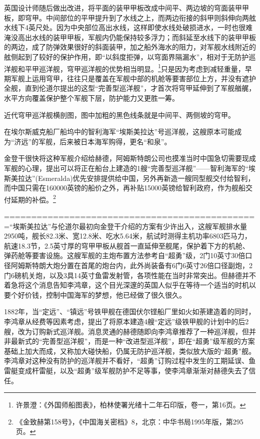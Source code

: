 \documentclass[12pt,UTF8]{ctexbook}
\begin{document}
英国设计师随后做出改进，将平面的装甲甲板改成中间平、两边坡的穹面装甲甲板，即穹甲。中间部位的平甲提升到了水线之上，而两边衔接的斜甲则斜伸向两舷水线下4英尺处。因为中央部位高出水线，这样即使水线处破损进水，一时也很难淹没高出水线的装甲甲板，军舰内仍能保持较多浮力；而斜延至水线下的装甲甲板的两边，成了防弹效果很好的斜面装甲，加之船外海水的阻力，对军舰水线附近的舷侧起到了较好的保护作用，即“以斜度拒弹，以穹面界隔漏水”，相对于无防护巡洋舰和平甲巡洋舰，穹甲巡洋舰的优势相当明显。\footnote{许景澄：《外国师船图表》，柏林使署光绪十二年石印版，卷一，第16页。}只是因为考虑到减轻重量，早期军舰上运用穹甲，往往只是覆盖在军舰中部的机舱等要害部位上方，并没有遮护全舰，直到伦道尔提出的这型“完善型巡洋舰”，才首次将穹甲延伸到了军舰艏艉，水平方向覆盖保护整个军舰下层，防护能力又更胜一筹。

近代穹甲巡洋舰横剖图，图中加粗的黑色线条就是中间平、两侧坡的穹甲。

在埃尔斯威克船厂船坞中的智利海军“埃斯美拉达”号巡洋舰，这艘原本可能成为“济远”的军舰，后来被日本海军购得，更名“和泉”。

金登干很快将这种军舰介绍给赫德，阿姆斯特朗公司也摸准当时中国急切需要现成军舰的心理，提出可以将正在船台上建造的1艘“完善型巡洋舰”——智利海军的“埃斯美拉达”(Esmeralda)优先安排提供给中国，另外再新造一艘同型舰交付给智利，而中国只需在160000英镑的船价之外，再补贴15000英镑给智利政府，作为舰船交付延期的补偿。\footnote{《金致赫第158号》，《中国海关密档》8，北京：中华书局1995年版，第295页。}

===============================================“埃斯美拉达”与伦道尔最初向金登干介绍的方案有少许出入，这艘军舰排水量2950吨，舰长82.3米、宽12.8米、吃水5.64米，航试时测得主机功率6803匹马力，航速18.3节，2.5英寸厚的穹甲甲板从舰首一直延伸至舰尾，保护着下方的机舱、弹药舱等要害设施。这艘军舰的主炮布置方法参考自“超勇”级，2门10英寸30倍口径阿姆斯特朗大炮分置在首尾的炮台内，此外尚装备有6门6英寸26倍口径副炮，2门6磅机关炮，以及3具14英寸鱼雷发射管，各项性能在当时非常突出。但赫德并不着急将这个消息告知李鸿章，这个目光深邃的英国人似乎在等待一个适当的时机以要个好价钱，控制中国海军的梦想，他已经做了很久很久。

1882年，当“定远”、“镇远”号铁甲舰在德国伏尔铿船厂里如火如荼建造着的同时，李鸿章从经费等因素考虑，提出了将原本建造4艘“定远”级铁甲舰的计划中的后2艘，改为订购新式巡洋舰。消息灵通的赫德随即向李鸿章推荐了一种巡洋舰，但并非最新式的“完善型巡洋舰”，而是一种“改进型巡洋舰”，即在“超勇”级军舰的方案基础上加大而成，又称加大碰快船，仍属无防护巡洋舰，类似放大版的“超勇”舰。李鸿章对这种没有防护的巡洋舰并不看好，“超勇”订购过程中发生的工期延误、鱼雷艇变成杆雷艇，以及“超勇”级军舰防护不足等事，使李鸿章渐渐对赫德失去了信任。
\end{document}
